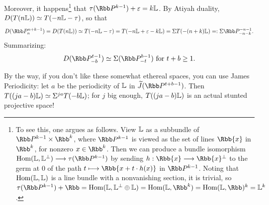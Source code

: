 Moreover, it happens\footnote{To see this, one argues as follows. View $\mathbb{L}$ as a subbundle of $\RP^{k-1}\times \Rbb^k$, where $\RP^{k-1}$ is viewed as the set of lines $\Rbb\{x\}$ in $\Rbb^k$, for nonzero $x\in\Rbb^k$. Then we can produce a bundle isomorphism $\Hom(\bundle{L},\bundle{L}^\perp)\to\tau(\RP^{k-1})$ by sending $h:\Rbb\{x\}\to \Rbb\{x\}^\perp$ to the germ at $0$ of the path $t\mapsto \Rbb\{x+t\cdot h(x)\}$ in $\RP^{k-1}$. Noting that $\operatorname{Hom}(\mathbb{L},\mathbb{L})$ is a line bundle with a nonvanishing section, it is trivial, so $\tau(\RP^{k-1})+\Rbb=\Hom(\bundle L,\bundle L^\perp\oplus\bundle L)=\Hom(\bundle L,\Rbb^k)=\Hom(\bundle L,\Rbb)^k=\bundle L^k$.} that $\tau(\RP^{k-1}) + \varepsilon = k \bundle{L}$.
By Atiyah duality, $D(T(n\mathbb{L})) \simeq T(-n \mathbb{L} - \tau)$, so that
\[D(\RP^{n+k-1}_n) = D(T(n\bundle{L})) \simeq T(-n \bundle{L} - \tau) = T(-n \bundle{L} + \varepsilon -k \bundle{L}) = \Suspend T(-(n+k)\bundle{L}) =: \Suspend \RP^{-n-1}_{-n-k}.\]
Summarizing:
\[D(\RP^{t-1}_{-b}) \simeq \Suspend (\RP^{b-1}_{-t})\text{ for }t+b\geq1.\]

By the way, if you don't like these somewhat ethereal spaces, you can use James Periodicity: let $a$ be the periodicity of $\mathbb{L}$ in $\widetilde J(\RP^{t+b-1})$.  Then $T((ja-b)\mathbb{L}) \simeq \Sigma^{ja} T(-b \mathbb{L})$; for $j$ big enough, $T((ja-b)\mathbb{L})$ is an actual stunted projective space!

